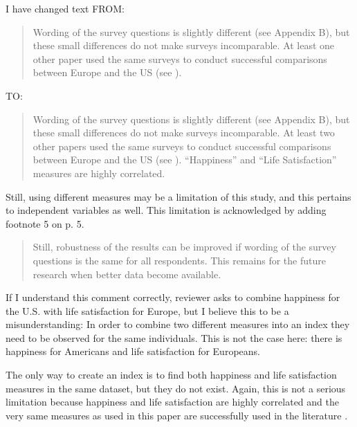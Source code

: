  I have changed text FROM:

\begin{quote}
 Wording of the
survey questions is slightly
different (see  Appendix B), but these small
differences do not make surveys
incomparable. At least one other paper used the same surveys
to conduct successful comparisons
between Europe and the US (see \citet{alesina03}). 
\end{quote}

\noindent TO:

\begin{quote}
Wording of the
survey questions is slightly
different (see  Appendix B), but these small
differences do not make surveys
incomparable. At least two other papers used the same surveys
to conduct successful comparisons
between Europe and the US (see \citet{alesina03, stevenson09w}). ``Happiness'' and ``Life
Satisfaction'' measures are highly correlated. 
\end{quote}

\noindent Still, using different measures may be a limitation of this study, and this pertains to
independent variables as well. This limitation is acknowledged by adding  
footnote 5 on p. 5.

\begin{quote}
 Still, robustness of the results can be improved if wording of the survey
 questions is the same for all respondents. This remains for the future research when better data
 become available.
\end{quote}



 If I understand this comment correctly, reviewer asks to combine happiness for the
U.S. with life satisfaction for Europe, but I believe this to be a misunderstanding: In order to
combine two different  measures into an index they need to be observed for the same
 individuals. This is not the case here: there is happiness for Americans and life satisfaction for Europeans.

\noindent The only way to create an index is to find both happiness and life satisfaction measures in the same
dataset, but they do not
exist. Again, this is not a serious limitation because happiness and life satisfaction
are highly correlated and the very same measures as used in this paper are successfully used in the
literature  \citep{alesina03, stevenson09w}.

